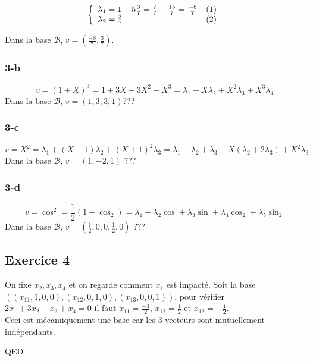 \documentclass[]{book}
\theoremstyle{definition}
\begin{document}
$$
\left\{ 
\begin{array}{l l}
\lambda_1 = 1 - 5\frac{3}{7} = \frac{7}{7}- \frac{15}{7} = \frac{-8}{7}& (1)\\
\lambda_2 = \frac{3}{7} & (2)\\
\end{array}
\right. 
$$ 

Dans la base $\mathcal{B}$, $v=(\frac{-8}{7},\frac{3}{7})$.

\subsubsection*{3-b}
$$v=(1+X)^3 = 1+3X+3X^2+X^3 = \lambda_1 + X\lambda_2 + X^2\lambda_3 + X^3\lambda_4$$
Dans la base $\mathcal{B}$, $v=(1,3,3,1)$???

\subsubsection*{3-c}
$$v=X^2 = \lambda_1 + (X+1)\lambda_2 + (X+1)^2\lambda_3 = \lambda_1+\lambda_2+\lambda_3 +X(\lambda_2+2\lambda_3) + X^2\lambda_3$$
Dans la base $\mathcal{B}$, $v=(1,-2,1)$ ???

\subsubsection*{3-d}
$$v=\cos^2 = \frac{1}{2}(1+\cos_2) = \lambda_1 + \lambda_2 \cos + \lambda_3 \sin + \lambda_4 \cos_2 + \lambda_5 \sin_2 $$
Dans la base $\mathcal{B}$, $v=(\frac{1}{2},0,0,\frac{1}{2},0)$ ???


\subsection*{Exercice 4}
On fixe $x_2, x_3,x_4$ et on regarde comment $x_1$ est impact\'e. Soit la base $( (x_{11},1,0,0), (x_{12},0,1,0), (x_{13},0,0,1))$, pour v\'erifier $2x_1+3x_2 -x_3+x_4 = 0$ il faut $x_{11}=\frac{-3}{2}$, $x_{12}=\frac{1}{2}$ et $x_{13}=-\frac{1}{2}$.\\
Ceci est m\'ecamiquement une base car les 3 vecteurs sont mutuellement ind\'ependants.



QED
\end{document}

